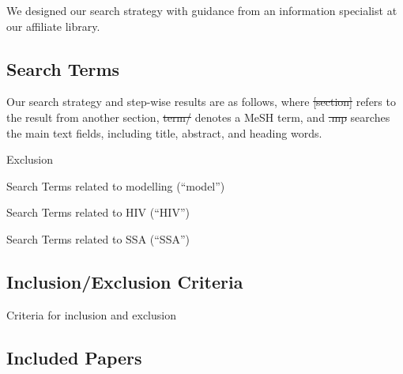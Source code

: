 We designed our search strategy with guidance from
an information specialist at our affiliate library.
\subsection{Search Terms}
\label{aa:search:terms}
Our search strategy and step-wise results are as follows, where
\st{[section]} refers to the result from another section,
\st{term/} denotes a MeSH term, and
\st{.mp} searches the main text fields, including
title, abstract, and heading words.
\def\searchsize{\scriptsize}
\begin{table}[H]
  \caption{Exclusion}
  \centering
  
  \label{tab:search-exclude}
\end{table}
\begin{table}[H]
  \caption{Search Terms related to modelling (``model'')}
  \centering
  
  \label{tab:search-model}
\end{table}
\begin{table}[H]
  \caption{Search Terms related to HIV (``HIV'')}
  \centering
  
  \label{tab:search-hiv}
\end{table}
\begin{table}[H]
  \caption{Search Terms related to SSA (``SSA'')}
  \centering
  
  \label{tab:search-ssa}
\end{table}
\subsection{Inclusion/Exclusion Criteria}
\label{aa:search:criteria}
\begin{table}[H]
  \caption{Criteria for inclusion and exclusion}
  \centering
  
  \label{tab:search-criteria}
\end{table}
\clearpage
\subsection{Included Papers}
\label{aa:search:database}
\newcommand{\pseudocite}[1]{%
  \parbox{0.33\linewidth}{\scriptsize%
    \parbox{5ex}{\hfill\parencite{#1}}
    \parbox{5ex}{\citeyear{#1}}
    \citeauthor{#1}%
}}
\footnotesize
